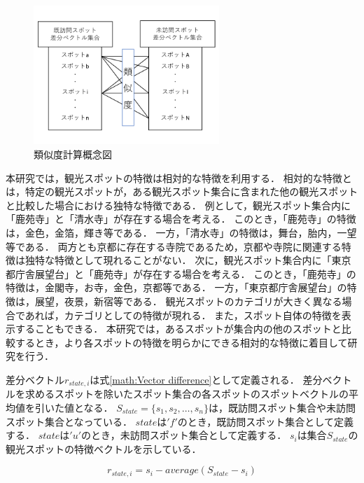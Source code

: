 \documentclass{deimj}
\begin{document}
\begin{figure}[t]
  \begin{center}
    \includegraphics[clip,width=7.0cm]{picture/Photo_CosSim_jap.png}
    \caption{類似度計算概念図}
    \label{fig:photo_cossim}
    \end{center}
\end{figure}

本研究では，観光スポットの特徴は相対的な特徴を利用する．
相対的な特徴とは，特定の観光スポットが，ある観光スポット集合に含まれた他の観光スポットと比較した場合における独特な特徴である．
例として，観光スポット集合内に「鹿苑寺」と「清水寺」が存在する場合を考える．
このとき，「鹿苑寺」の特徴は，金色，金箔，輝き等である．
一方，「清水寺」の特徴は，舞台，胎内，一望等である．
両方とも京都に存在する寺院であるため，京都や寺院に関連する特徴は独特な特徴として現れることがない．
次に，観光スポット集合内に「東京都庁舎展望台」と「鹿苑寺」が存在する場合を考える．
このとき，「鹿苑寺」の特徴は，金閣寺，お寺，金色，京都等である．
一方，「東京都庁舎展望台」の特徴は，展望，夜景，新宿等である．
観光スポットのカテゴリが大きく異なる場合であれば，カテゴリとしての特徴が現れる．
また，スポット自体の特徴を表示することもできる．
本研究では，あるスポットが集合内の他のスポットと比較するとき，より各スポットの特徴を明らかにできる相対的な特徴に着目して研究を行う．

差分ベクトル$r_{state,i}$は式\ref{math:Vector difference}として定義される．
差分ベクトルを求めるスポットを除いたスポット集合の各スポットのスポットベクトルの平均値を引いた値となる．
$S_{state} =\{s_1,s_2,\dots,s_n\}$は，既訪問スポット集合や未訪問スポット集合となっている．
$state$は$'f'$のとき，既訪問スポット集合として定義する．
$state$は$'u'$のとき，未訪問スポット集合として定義する．
$s_i$は集合$S_{state}$の観光スポットの特徴ベクトルを示している．

\begin{equation}
  r_{state,i}=s_i-average(S_{state}-s_i)
  \label{math:Vector difference}
\end{equation}
\end{document}
